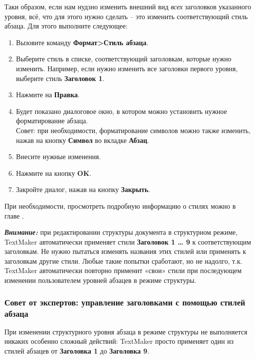 ﻿\documentclass[a4paper,10pt]{article}
\begin{document}
Таки образом, если нам нудзно изменить внешний вид \textit{всех} заголовков указанного уровня, всё, что для этого нужно сделать -- это изменить соответствующий стиль абзаца. Для этого выполните следующее:

\begin{enumerate}
 \item Вызовите команду \textbf{Формат>Стиль абзаца}.
 \item Выберите стиль в списке, соответствующий заголовкам, которые нужно изменить. Например, если нужно изменить все заголовки первого уровня, выберите стиль \textbf{Заголовок 1}.
 \item Нажмите на \textbf{Правка}.
 \item Будет показано диалоговое окно, в котором можно установить нужное форматирование абзаца.\\
 Совет: при необходимости, форматирование символов можно также изменить, нажав на кнопку \textbf{Символ} во вкладке \textbf{Абзац}.
 \item Внесите нужные изменения.
 \item  Нажмите на кнопку \textbf{OK}.
 \item Закройте диалог, нажав на кнопку \textbf{Закрыть}.
\end{enumerate}

При необходимости, просмотреть подробную информацию о стилях можно в главе .

\pagebreak

\begin{mdframed}[backgroundcolor=blue!10]
\textbf{\textit{Внимание:}} при редактировании структуры документа в структурном режиме, TextMaker автоматически применяет стили \textbf{Заголовок 1 … 9} к соответствующим заголовкам. Не нужно пытаться изменять названия этих стилей или применять к заголовкам другие стили. Любые такие попытки сработают, но не надолго, т.к. TextMaker автоматически повторно применит «свои» стили при последующем изменении пользователем уровней абзацев в режиме структуры.
\end{mdframed}

\subsubsection{Совет от экспертов: управление заголовками с помощью стилей абзаца}
При изменении структурного уровня абзаца в режиме структуры не выполняется никаких особенно сложный действий: TextMaker просто применяет один из стилей абзацев от \textbf{Заголовка 1} до \textbf{Заголовка 9}.
\end{document}
